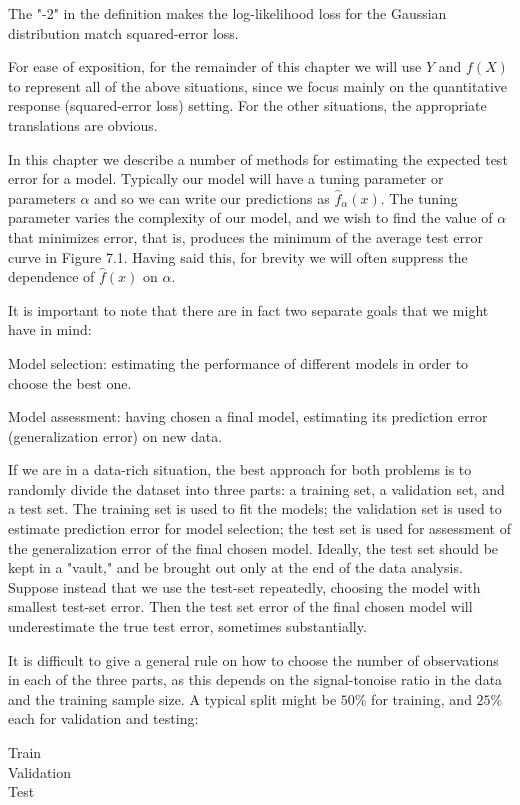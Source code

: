 \documentclass[10pt]{article}
\begin{document}
The "-2" in the definition makes the log-likelihood loss for the Gaussian distribution match squared-error loss.

For ease of exposition, for the remainder of this chapter we will use $Y$ and $f(X)$ to represent all of the above situations, since we focus mainly on the quantitative response (squared-error loss) setting. For the other situations, the appropriate translations are obvious.

In this chapter we describe a number of methods for estimating the expected test error for a model. Typically our model will have a tuning parameter or parameters $\alpha$ and so we can write our predictions as $\hat{f}_{\alpha}(x)$. The tuning parameter varies the complexity of our model, and we wish to find the value of $\alpha$ that minimizes error, that is, produces the minimum of the average test error curve in Figure 7.1. Having said this, for brevity we will often suppress the dependence of $\hat{f}(x)$ on $\alpha$.

It is important to note that there are in fact two separate goals that we might have in mind:

Model selection: estimating the performance of different models in order to choose the best one.

Model assessment: having chosen a final model, estimating its prediction error (generalization error) on new data.

If we are in a data-rich situation, the best approach for both problems is to randomly divide the dataset into three parts: a training set, a validation set, and a test set. The training set is used to fit the models; the validation set is used to estimate prediction error for model selection; the test set is used for assessment of the generalization error of the final chosen model. Ideally, the test set should be kept in a "vault," and be brought out only at the end of the data analysis. Suppose instead that we use the test-set repeatedly, choosing the model with smallest test-set error. Then the test set error of the final chosen model will underestimate the true test error, sometimes substantially.

It is difficult to give a general rule on how to choose the number of observations in each of the three parts, as this depends on the signal-tonoise ratio in the data and the training sample size. A typical split might be $50 \%$ for training, and $25 \%$ each for validation and testing:

Train\\
Validation\\
Test
\end{document}
